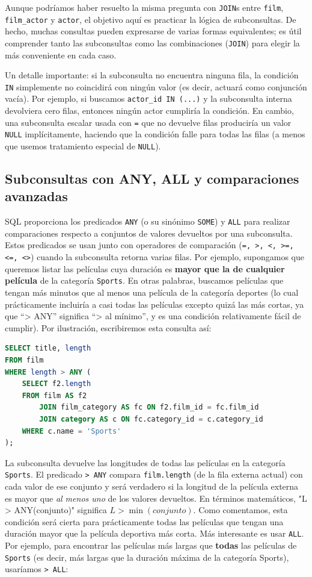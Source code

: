 \documentclass[12pt,a4paper]{article}
\begin{document}
Aunque podríamos haber resuelto la misma pregunta con \texttt{JOIN}s entre \texttt{film}, \texttt{film\_actor} y \texttt{actor}, el objetivo aquí es practicar la lógica de subconsultas.
%
De hecho, muchas consultas pueden expresarse de varias formas equivalentes; es útil comprender tanto las subconsultas como las combinaciones (\texttt{JOIN}) para elegir la más conveniente en cada caso.


Un detalle importante: si la subconsulta no encuentra ninguna fila, la condición \texttt{IN} simplemente no coincidirá con ningún valor (es decir, actuará como conjunción vacía).
%
Por ejemplo, si buscamos \texttt{actor\_id IN (...)} y la subconsulta interna devolviera cero filas, entonces ningún actor cumpliría la condición.
%
En cambio, una subconsulta escalar usada con \texttt{=} que no devuelve filas produciría un valor \texttt{NULL} implícitamente, haciendo que la condición falle para todas las filas (a menos que usemos tratamiento especial de \texttt{NULL}). 


\subsection*{Subconsultas con ANY, ALL y comparaciones avanzadas} SQL proporciona los predicados \texttt{ANY} (o su sinónimo \texttt{SOME}) y \texttt{ALL} para realizar comparaciones respecto a conjuntos de valores devueltos por una subconsulta.
%
Estos predicados se usan junto con operadores de comparación (\texttt{=, >, <, >=, <=, <>}) cuando la subconsulta retorna varias filas.
%
Por ejemplo, supongamos que queremos listar las películas cuya duración es \textbf{mayor que la de cualquier película} de la categoría \texttt{Sports}.
%
En otras palabras, buscamos películas que tengan más minutos que al menos una película de la categoría deportes (lo cual prácticamente incluiría a casi todas las películas excepto quizá las más cortas, ya que “> ANY” significa “> al mínimo”, y es una condición relativamente fácil de cumplir).
%
Por ilustración, escribiremos esta consulta así: 


\begin{lstlisting}[language=SQL]
SELECT title, length
FROM film
WHERE length > ANY (
	SELECT f2.length
	FROM film AS f2
		JOIN film_category AS fc ON f2.film_id = fc.film_id
		JOIN category AS c ON fc.category_id = c.category_id
	WHERE c.name = 'Sports'
);
\end{lstlisting}


La subconsulta devuelve las longitudes de todas las películas en la categoría \texttt{Sports}.
%
El predicado \texttt{> ANY} compara \texttt{film.length} (de la fila externa actual) con cada valor de ese conjunto y será verdadero si la longitud de la película externa es mayor que \textit{al menos uno} de los valores devueltos.
%
En términos matemáticos, "L > ANY(conjunto)" significa $L > \min(conjunto)$.
%
Como comentamos, esta condición será cierta para prácticamente todas las películas que tengan una duración mayor que la película deportiva más corta.
%
Más interesante es usar \texttt{ALL}.
%
Por ejemplo, para encontrar las películas más largas que \textbf{todas} las películas de \texttt{Sports} (es decir, más largas que la duración máxima de la categoría Sports), usaríamos \texttt{> ALL}: 
\end{document}
